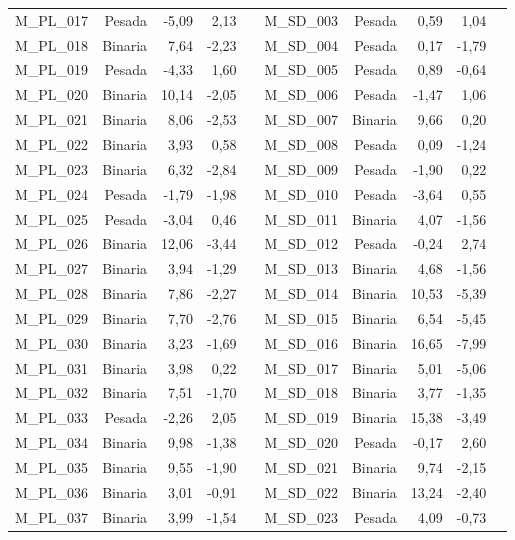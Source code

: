 \begin{table}[ht!]
\begin{tabular}{lrrrrrrrrr}
    M\_PL\_017 & Pesada & -5,09 & 2,13 &      & M\_SD\_003 & Pesada & 0,59 & 1,04 \\
    M\_PL\_018 & Binaria & 7,64 & -2,23 &      & M\_SD\_004 & Pesada & 0,17 & -1,79 \\
    M\_PL\_019 & Pesada & -4,33 & 1,60 &      & M\_SD\_005 & Pesada & 0,89 & -0,64 \\
    M\_PL\_020 & Binaria & 10,14 & -2,05 &      & M\_SD\_006 & Pesada & -1,47 & 1,06 \\
    M\_PL\_021 & Binaria & 8,06 & -2,53 &      & M\_SD\_007 & Binaria & 9,66 & 0,20 \\
    M\_PL\_022 & Binaria & 3,93 & 0,58 &      & M\_SD\_008 & Pesada & 0,09 & -1,24 \\
    M\_PL\_023 & Binaria & 6,32 & -2,84 &      & M\_SD\_009 & Pesada & -1,90 & 0,22 \\
    M\_PL\_024 & Pesada & -1,79 & -1,98 &      & M\_SD\_010 & Pesada & -3,64 & 0,55 \\
    M\_PL\_025 & Pesada & -3,04 & 0,46 &      & M\_SD\_011 & Binaria & 4,07 & -1,56 \\
    M\_PL\_026 & Binaria & 12,06 & -3,44 &      & M\_SD\_012 & Pesada & -0,24 & 2,74 \\
    M\_PL\_027 & Binaria & 3,94 & -1,29 &      & M\_SD\_013 & Binaria & 4,68 & -1,56 \\
    M\_PL\_028 & Binaria & 7,86 & -2,27 &      & M\_SD\_014 & Binaria & 10,53 & -5,39 \\
    M\_PL\_029 & Binaria & 7,70 & -2,76 &      & M\_SD\_015 & Binaria & 6,54 & -5,45 \\
    M\_PL\_030 & Binaria & 3,23 & -1,69 &      & M\_SD\_016 & Binaria & 16,65 & -7,99 \\
    M\_PL\_031 & Binaria & 3,98 & 0,22 &      & M\_SD\_017 & Binaria & 5,01 & -5,06 \\
    M\_PL\_032 & Binaria & 7,51 & -1,70 &      & M\_SD\_018 & Binaria & 3,77 & -1,35 \\
    M\_PL\_033 & Pesada & -2,26 & 2,05 &      & M\_SD\_019 & Binaria & 15,38 & -3,49 \\
    M\_PL\_034 & Binaria & 9,98 & -1,38 &      & M\_SD\_020 & Pesada & -0,17 & 2,60 \\
    M\_PL\_035 & Binaria & 9,55 & -1,90 &      & M\_SD\_021 & Binaria & 9,74 & -2,15 \\
    M\_PL\_036 & Binaria & 3,01 & -0,91 &      & M\_SD\_022 & Binaria & 13,24 & -2,40 \\
    M\_PL\_037 & Binaria & 3,99 & -1,54 &      & M\_SD\_023 & Pesada & 4,09 & -0,73 \\

\end{tabular}
\end{table}
